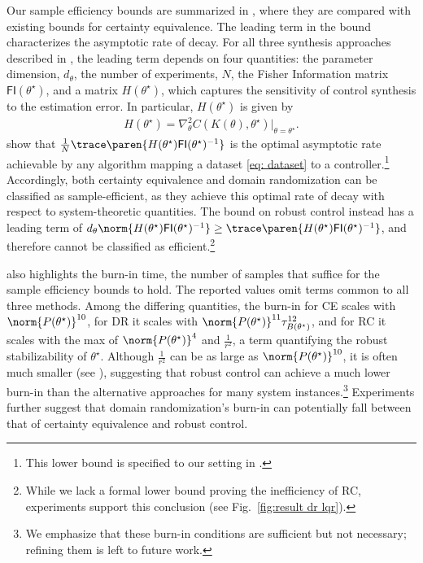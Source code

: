 Our sample efficiency bounds are summarized in , where they are compared with existing bounds for certainty equivalence. The leading term in the bound characterizes the asymptotic rate of decay. For all three synthesis approaches described in , the leading term depends on four quantities: the parameter dimension, $d_{\theta}$, the number of experiments, $N$, the Fisher Information matrix $\mathsf{FI}(\theta^\star)$, and a matrix $H(\theta^\star)$, which captures the sensitivity of control synthesis to the estimation error. In particular, $H(\theta^\star)$ is given by
\begin{align*}
    H(\theta^\star) = \nabla_{\theta}^2 C(K(\theta), \theta^\star)\vert_{\theta=\theta^\star}.
\end{align*}
\citet{wagenmaker2021task} show that $\frac{1}{N}\trace\paren{H(\theta^\star) \mathsf{FI}(\theta^\star)^{-1}}$ is the optimal asymptotic rate achievable by any algorithm mapping a dataset \eqref{eq: dataset} to a controller.\footnote{This lower bound is specified to our setting in .} Accordingly, both certainty equivalence and domain randomization can be classified as sample-efficient, as they achieve this optimal rate of decay with respect to system-theoretic quantities. The bound on robust control instead has a leading term of $d_{\theta} \norm{H(\theta^\star) \mathsf{FI}(\theta^\star)^{-1}} \geq \trace\paren{H(\theta^\star) \mathsf{FI}(\theta^\star)^{-1}}$, and therefore cannot be classified as efficient.\footnote{While we lack a formal lower bound proving the inefficiency of RC, experiments support this conclusion (see Fig.~\ref{fig:result dr lqr}).} 

 also highlights the burn-in time, the number of samples that suffice for the sample efficiency bounds to hold. The reported values omit terms common to all three methods. Among the differing quantities, the burn-in for CE scales with $\norm{P(\theta^\star)}^{10}$, for DR it scales with $\norm{P(\theta^\star)}^{11}\tau_{B(\theta^\star)}^{12}$, and for RC it scales with the max of $\norm{P(\theta^\star)}^{4}$ and $\frac{1}{r^2}$, a term quantifying the robust stabilizability of $\theta^\star$. Although $\frac{1}{r^2}$ can be as large as $\norm{P(\theta^\star)}^{10}$, it is often much smaller (see ), suggesting that robust control can achieve a much lower burn-in than the alternative approaches for many system instances.\footnote{We emphasize that these burn-in conditions are sufficient but not necessary; refining them is left to future work.} Experiments further suggest that domain randomization's burn-in can potentially fall between that of certainty equivalence and robust control.

